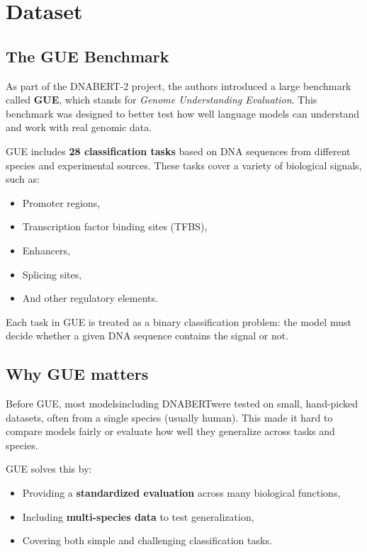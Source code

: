 \section{Dataset}

\subsection{The GUE Benchmark}

As part of the DNABERT-2 project, the authors introduced a large benchmark called \textbf{GUE}, which stands for \textit{Genome Understanding Evaluation}. This benchmark was designed to better test how well language models can understand and work with real genomic data.

GUE includes \textbf{28 classification tasks} based on DNA sequences from different species and experimental sources. These tasks cover a variety of biological signals, such as:
\begin{itemize}
\item Promoter regions,
\item Transcription factor binding sites (TFBS),
\item Enhancers,
\item Splicing sites,
\item And other regulatory elements.
\end{itemize}

Each task in GUE is treated as a binary classification problem: the model must decide whether a given DNA sequence contains the signal or not.

\subsection{Why GUE matters}

Before GUE, most models\textemdash including DNABERT\textemdash were tested on small, hand-picked datasets, often from a single species (usually human). This made it hard to compare models fairly or evaluate how well they generalize across tasks and species.

GUE solves this by:
\begin{itemize}
\item Providing a \textbf{standardized evaluation} across many biological functions,
\item Including \textbf{multi-species data} to test generalization,
\item Covering both simple and challenging classification tasks.
\end{itemize}

